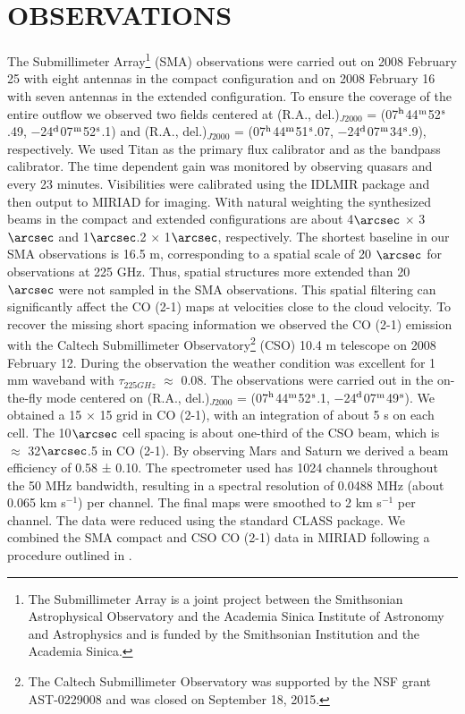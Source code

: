 \section{OBSERVATIONS}
The Submillimeter Array\footnote{    The Submillimeter Array is a joint project between the Smithsonian Astrophysical Observatory and the Academia Sinica Institute of Astronomy and Astrophysics and is funded by the Smithsonian Institution and the Academia Sinica.} (SMA) observations were carried out on 2008 February 25 with eight antennas in the compact configuration and on 2008 February 16 with seven antennas in the extended configuration. To ensure the coverage of the entire outflow we observed two fields centered at (R.A., del.)$_{J2000}$ = (07$^\textup{h}$44$^\textup{m}$52$^\textup{s}$.49, −24$^\textup{d}$07$^\textup{m}$52$^\textup{s}$.1) and (R.A., del.)$_{J2000}$ = (07$^\textup{h}$44$^\textup{m}$51$^\textup{s}$.07, −24$^\textup{d}$07$^\textup{m}$34$^\textup{s}$.9), respectively. We used Titan as the primary flux calibrator and  as the bandpass calibrator. The time dependent gain was monitored
by observing quasars  and  every 23 minutes. Visibilities were calibrated using the IDLMIR package and then output to MIRIAD for imaging. With natural weighting the synthesized beams in the compact and extended configurations are about 4${\arcsec}$ $\times$ 3${\arcsec}$ and 1${\arcsec}$.2 $\times$ 1${\arcsec}$, respectively. The shortest baseline in our SMA observations is 16.5 m, corresponding to a spatial scale of 20 ${\arcsec}$ for observations at 225 GHz. Thus, spatial structures more extended than 20 ${\arcsec}$ were not sampled in the SMA observations. This spatial filtering can significantly affect the CO (2-1) maps at velocities close to the cloud velocity. To recover the missing short spacing information we observed the CO (2-1) emission with the Caltech
Submillimeter Observatory\footnote{    The Caltech Submillimeter Observatory was supported by the NSF grant
AST-0229008 and was closed on September 18, 2015.} (CSO) 10.4 m telescope on 2008 February 12. During the observation the weather condition was excellent for 1 mm waveband with $\tau_{225GHz}$ $\approx$ 0.08. The observations were carried out in the on-the-fly mode centered on (R.A., del.)$_{J2000}$ = (07$^\textup{h}$44$^\textup{m}$52$^\textup{s}$.1, −24$^\textup{d}$07$^\textup{m}$49$^\textup{s}$). We obtained a 15 × 15 grid in CO (2-1), with an integration of about 5 s on each cell. The 10${\arcsec}$ cell spacing is about one-third of the CSO beam, which is $\approx$ 32${\arcsec}$.5 in CO (2-1). By observing Mars and Saturn we derived a beam efficiency of 0.58 ± 0.10. The spectrometer used has 1024 channels throughout the 50 MHz bandwidth, resulting in a spectral resolution of 0.0488 MHz (about 0.065 km s$^{-1}$) per channel. The final maps were smoothed to 2 km s$^{-1}$ per channel. The data were reduced using the standard CLASS package. We combined the SMA compact and CSO CO (2-1) data in MIRIAD following a procedure outlined in \citet{1995ApJ...451L..71Z}. 

